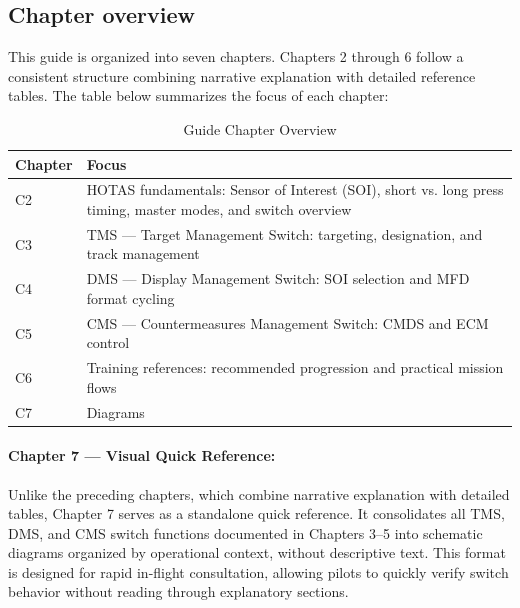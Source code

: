 \documentclass[11pt, a4paper, twoside]{report}
\begin{document}
\subsection{Chapter overview}
\label{sec:C1-S3-S1}

This guide is organized into seven chapters. Chapters 2 through 6 follow a consistent structure combining narrative explanation with detailed reference tables. The table below summarizes the focus of each chapter:

\begin{table}[H]
\centering
\caption{Guide Chapter Overview}
\label{tab:C1-chapter-overview}
\small
\renewcommand{\arraystretch}{1.25}
\begin{tabular}{C{1.5cm} L{12.0cm}}
\toprule
\textbf{Chapter} & \textbf{Focus} \\
\midrule
C2 & HOTAS fundamentals: Sensor of Interest (SOI), short vs. long press timing, master modes, and switch overview \\
C3 & TMS --- Target Management Switch: targeting, designation, and track management \\
C4 & DMS --- Display Management Switch: SOI selection and MFD format cycling \\
C5 & CMS --- Countermeasures Management Switch: CMDS and ECM control \\
C6 & Training references: recommended progression and practical mission flows \\
C7 & Diagrams \\
\bottomrule
\end{tabular}
\end{table}

\paragraph{Chapter 7 --- Visual Quick Reference:}
Unlike the preceding chapters, which combine narrative explanation with detailed tables, Chapter 7 serves as a standalone quick reference. It consolidates all TMS, DMS, and CMS switch functions documented in Chapters 3--5 into schematic diagrams organized by operational context, without descriptive text. This format is designed for rapid in-flight consultation, allowing pilots to quickly verify switch behavior without reading through explanatory sections.

\end{document}
